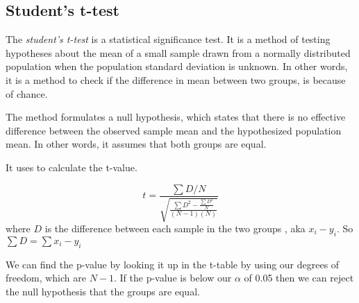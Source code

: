 \subsection{Student's t-test}
\label{section:BT:t-statistic-test}
The \textit{student's t-test} is a statistical significance test.
It is a method of testing hypotheses about the mean of a small sample drawn from
a normally distributed population when the population standard deviation is unknown.
In other words, it is a method to check if the difference in mean between two groups,
is because of chance.

The method formulates a null hypothesis, which states that there is no effective difference
between the observed sample mean and the hypothesized population mean. In other words, it assumes that
both groups are equal.

It uses  to calculate the t-value.


\begin{equation}
  \label{eq:t-formula-simplified}
  t = \frac{\sum{D} / N} {\sqrt{\frac{\sum{D^2} - \frac{\sum{D}^2}{N}}{(N-1)(N)} } }
\end{equation}
where $D$ is the difference between each sample in the two groups , aka $x_i - y_i$.
So $\sum{D} = \sum{x_i - y_i}$

We can find the p-value by looking it up in the t-table by using our degrees of freedom, which are $N-1$.
If the p-value is below our $\alpha$ of 0.05 then we can reject the null hypothesis that the groups are equal.


